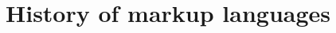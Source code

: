 \chapter{History of markup languages}
\label{chap:history}

\cite{coombs1987markup}

\cite{piotrowski2019history}